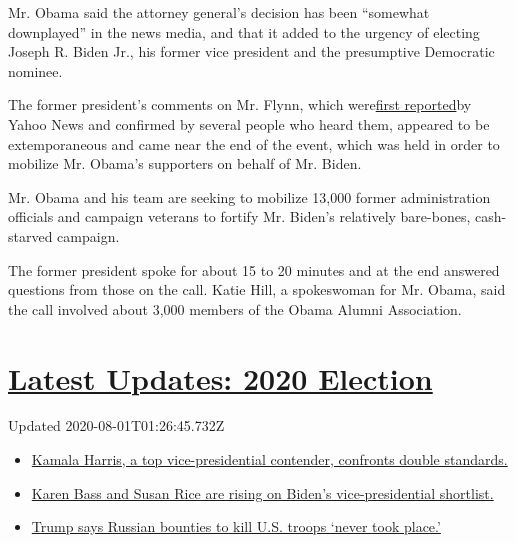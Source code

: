 Mr. Obama said the attorney general's decision has been ``somewhat
downplayed'' in the news media, and that it added to the urgency of
electing Joseph R. Biden Jr., his former vice president and the
presumptive Democratic nominee.

The former president's comments on Mr. Flynn, which
were\href{https://news.yahoo.com/obama-irule-of-law-michael-flynn-case-014121045.html}{first
reported}by Yahoo News and confirmed by several people who heard them,
appeared to be extemporaneous and came near the end of the event, which
was held in order to mobilize Mr. Obama's supporters on behalf of Mr.
Biden.

Mr. Obama and his team are seeking to mobilize 13,000 former
administration officials and campaign veterans to fortify Mr. Biden's
relatively bare-bones, cash-starved campaign.

The former president spoke for about 15 to 20 minutes and at the end
answered questions from those on the call. Katie Hill, a spokeswoman for
Mr. Obama, said the call involved about 3,000 members of the Obama
Alumni Association.

\hypertarget{latest-updates-2020-election}{%
\section{\texorpdfstring{\href{https://www.nytimes.com/2020/07/31/us/elections/biden-vs-trump.html?action=click\&pgtype=Article\&state=default\&region=MAIN_CONTENT_1\&context=storylines_live_updates}{Latest
Updates: 2020
Election}}{Latest Updates: 2020 Election}}\label{latest-updates-2020-election}}

Updated 2020-08-01T01:26:45.732Z

\begin{itemize}
\tightlist
\item
  \href{https://www.nytimes.com/2020/07/31/us/elections/biden-vs-trump.html?action=click\&pgtype=Article\&state=default\&region=MAIN_CONTENT_1\&context=storylines_live_updates\#link-29fdff45}{Kamala
  Harris, a top vice-presidential contender, confronts double
  standards.}
\item
  \href{https://www.nytimes.com/2020/07/31/us/elections/biden-vs-trump.html?action=click\&pgtype=Article\&state=default\&region=MAIN_CONTENT_1\&context=storylines_live_updates\#link-13ec3d9c}{Karen
  Bass and Susan Rice are rising on Biden's vice-presidential
  shortlist.}
\item
  \href{https://www.nytimes.com/2020/07/31/us/elections/biden-vs-trump.html?action=click\&pgtype=Article\&state=default\&region=MAIN_CONTENT_1\&context=storylines_live_updates\#link-49e9a016}{Trump
  says Russian bounties to kill U.S. troops `never took place.'}
\end{itemize}

